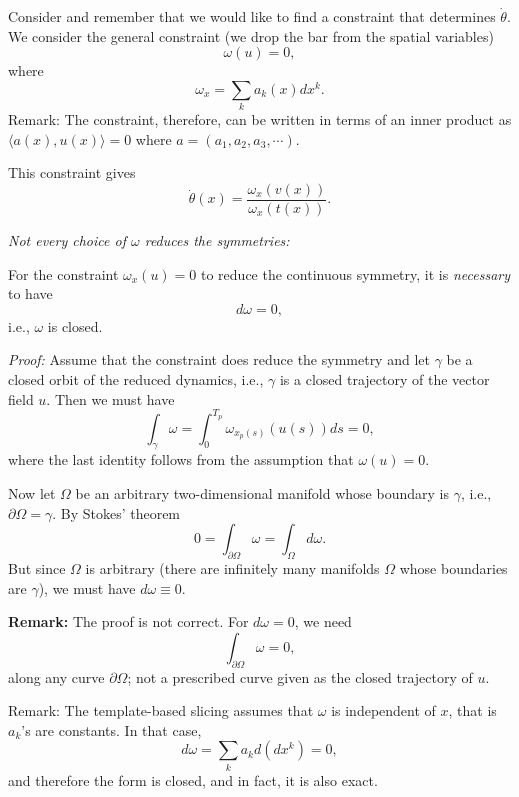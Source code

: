 \begin{description}
{Consider  and remember that we would like to find a constraint that determines $\dot\theta$. We consider the general constraint (we drop the bar from the spatial variables)
$$\omega (u)=0,$$
where
$$\omega_{x}=\sum_k a_k(x)dx^k.$$
Remark: The constraint, therefore, can be written in terms of an inner product as $\langle a(x),u(x)\rangle =0$ where $a=(a_1,a_2,a_3,\cdots)$.

This constraint gives
\begin{equation}
\dot \theta(x) =\frac{\omega_{x}(v(x))}{\omega_{x} (t(x))}.
\label{eq:const_form_02}
\end{equation}

\textit{Not every choice of $\omega$ reduces the symmetries:}\\
\begin{theorem} For the constraint $\omega_{x} (u)=0$ to reduce the continuous symmetry, it is \emph{necessary} to have
$$d\omega=0,$$
i.e., $\omega$ is closed.
\label{thm:form_necessary_cond}
\end{theorem}

\textit{Proof:}
Assume that the constraint does reduce the symmetry and let $\gamma$ be a closed orbit of the reduced dynamics, i.e., $\gamma$ is a closed trajectory of the vector field $u$. Then we must have
$$\int_{\gamma}\omega =\int_0^{T_p} \omega_{x_p(s)}(u(s))ds=0,$$
where the last identity follows from the assumption that $\omega (u)=0$.

Now let $\Omega$ be an arbitrary two-dimensional manifold whose boundary is $\gamma$, i.e., $\partial \Omega =\gamma$. By Stokes' theorem
$$0=\int_{\partial \Omega }\omega = \int_\Omega d\omega.$$
But since $\Omega$ is arbitrary (there are infinitely many manifolds $\Omega$ whose
boundaries are $\gamma$), we must have $d\omega \equiv0$.

{\bf Remark:} The proof is not correct. For $d\omega=0$, we need
$$\int_{\partial \Omega }\omega=0,$$
along any curve $\partial \Omega$; not a prescribed curve given as the closed trajectory
of $u$.

Remark:
The template-based slicing assumes that $\omega$ is independent of $x$, that is $a_k$'s are constants. In that case,
$$d\omega = \sum_k a_kd(dx^k)=0,$$
and therefore the form is closed, and in fact, it is also exact.
}


\end{description}

